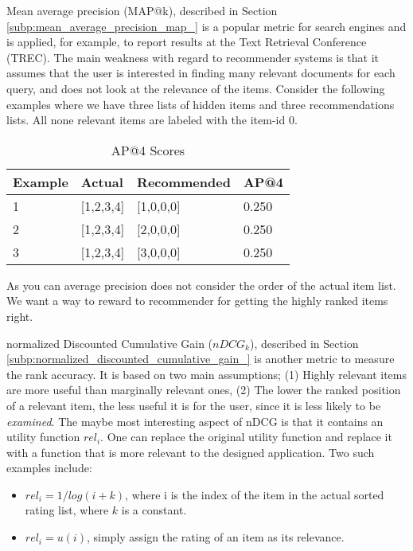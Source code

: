 

Mean average precision (MAP@k), described in Section \ref{subp:mean_average_precision_map_} is a popular metric for search engines and is applied, for example, to report results at the Text Retrieval Conference (TREC). The main weakness with regard to recommender systems is that it assumes that the user is interested in finding many relevant documents for each query, and does not look at the relevance of the items. Consider the following examples where we have three lists of hidden items and three recommendations lists. All none relevant items are labeled with the item-id $0$.

\begin{table}[H]
\label{table:ap}
\centering
\begin{tabular}{*{4}l}
\toprule
Example 	& 	Actual	& 	Recommended		&	AP@4   \\ \midrule
1			& [1,2,3,4]	&	[1,0,0,0]		&	0.250  \\ 
2			& [1,2,3,4]	&	[2,0,0,0]		&	0.250  \\ 
3			& [1,2,3,4]	&	[3,0,0,0]		&	0.250  \\
\bottomrule
\end{tabular}
\caption{AP@4 Scores}
\end{table}

As you can average precision does not consider the order of the actual item list. We want a way to
reward to recommender for getting the highly ranked items right.

normalized Discounted Cumulative Gain ($nDCG_{k}$), described in Section \ref{subp:normalized_discounted_cumulative_gain_}
is another metric to measure the rank accuracy. It is based on two main assumptions; (1) Highly relevant items are more useful than marginally relevant ones, (2) The lower the ranked position of a relevant item, the less useful it is for the user, since it is less likely to be \emph{examined}. The maybe most interesting aspect of nDCG is that it contains an utility function $rel_i$. One can replace the original utility function and replace it with a function that is more relevant to
the designed application. Two such examples include:

\begin{itemize}
\item $rel_i = 1/log(i+k)$, where i is the index of the item in the actual sorted rating list, where $k$ is a constant.
\item $rel_i = u(i)$, simply assign the rating of an item as its relevance.
\end{itemize}


